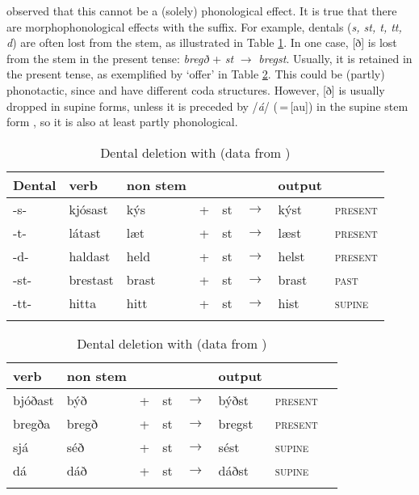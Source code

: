 \documentclass[output=paper]{langscibook}
\begin{document}
\citet{Anderson:1990sm} observed that this cannot be a (solely) phonological effect. It is true that there are morphophonological effects with the \sti{} suffix. For example, dentals (\textit{s, st, t, tt, d}) are often lost from the stem, as illustrated in Table \ref{woodstem}. In one case, [ð] is lost from the stem in the present tense: \textit{bregð} + \textit{st} $\rightarrow$ \textit{bregst}. Usually, it is retained in the present tense, as exemplified by  `offer' in Table \ref{woodeth}. This could be (partly) phonotactic, since  and  have different coda structures.  However, [ð] is usually dropped in supine forms, unless it is preceded by /\textit{á}/ (\,=\,[au]) in the supine stem form \citep[380]{Thomson:1987bn}, so it is also at least partly phonological.


\begin{table}
\caption{Dental deletion with \sti{} (data from \citealt[380]{Thomson:1987bn})
\label{woodstem}}  
\begin{tabular}{llllllll}
\lsptoprule
Dental & \sti{} verb & non\sti{} stem & & & & output & \\\midrule
-s- & kjósast & kýs & + & st & $\rightarrow$ & kýst & \textsc{present}\\
-t- & látast & læt & + & st & $\rightarrow$ & læst & \textsc{present}\\
-d- & haldast & held & + & st & $\rightarrow$ & helst & \textsc{present}\\
-st- & brestast & brast & + & st & $\rightarrow$ & brast & \textsc{past}\\
-tt- & hitta & hitt & + & st & $\rightarrow$ & hist & \textsc{supine} \\
\lspbottomrule
\end{tabular}
\end{table}

\begin{table}
\caption{Dental deletion with \sti{} (data from \citealt[380]{Thomson:1987bn})\label{woodeth}} 
\begin{tabular}{llllllll}
\lsptoprule
\sti{} verb & non\sti{} stem & & & & output & \\\midrule
bjóðast & býð & + & st & $\rightarrow$ & býðst & \textsc{present} \\
bregða & bregð & + & st & $\rightarrow$ & bregst & \textsc{present} \\
sjá & séð & + & st & $\rightarrow$ & sést & \textsc{supine} \\
dá & dáð & + & st & $\rightarrow$ & dáðst & \textsc{supine} \\
\lspbottomrule
\end{tabular}
\end{table}
\end{document}
